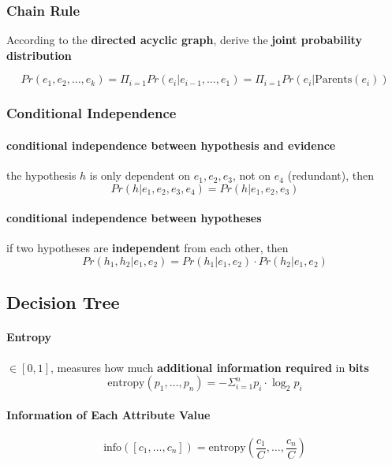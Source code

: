 \subsubsection{Chain Rule}
According to the \textbf{directed acyclic graph}, derive the \textbf{joint probability distribution} 

$$Pr(e_1, e_2, \dots, e_k) = \Pi_{i=1} Pr(e_i| e_{i-1}, \dots, e_1) = \Pi_{i=1} Pr(e_i| \text{Parents}(e_i))$$

\subsubsection{Conditional Independence}
\paragraph{conditional independence between hypothesis and evidence} the hypothesis $h$ is only dependent on $e_1, e_2, e_3$, not on $e_4$ (redundant), then 
$$Pr(h | e_1, e_2, e_3, e_4) = Pr(h | e_1, e_2, e_3) $$

\paragraph{conditional independence between hypotheses}

if two hypotheses are \textbf{independent} from each other, then
$$Pr(h_1, h_2 | e_1, e_2) = Pr(h_1|e_1,e_2) \cdot Pr(h_2|e_1,e_2)$$











\subsection{Decision Tree}
\paragraph{Entropy} $\in [0,1]$, measures how much \textbf{additional information required} in \textbf{bits}
	$$\text{entropy}(p_1, \dots, p_n) = - \Sigma_{i=1} ^n p_i \cdot \log_{2} p_i$$
	
\paragraph{Information of Each Attribute Value}
	
	$$\text{info}([c_1, \dots, c_n]) = \text{entropy}(\frac{c_1}{C}, \dots, \frac{c_n}{C})$$ 
	
